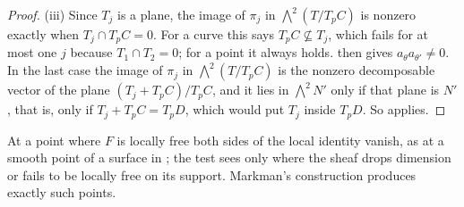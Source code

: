 \documentclass[11pt,reqno]{amsart}
\theoremstyle{plain}
\theoremstyle{definition}
\theoremstyle{remark}
\begin{document}
\begin{proof}
(iii) Since $T_{j}$ is a plane, the image of $\pi_{j}$ in
$\bigwedge^{2}(T/T_{p}C)$ is nonzero exactly when $T_{j}\cap T_{p}C=0$. For a
curve this says $T_{p}C\not\subseteq T_{j}$, which fails for at most one $j$
because $T_{1}\cap T_{2}=0$; for a point it always holds. 
then gives $a_{\theta}a_{\theta'}\ne0$. In the last case the image of
$\pi_{j}$ in $\bigwedge^{2}(T/T_{p}C)$ is the nonzero decomposable vector of
the plane $(T_{j}+T_{p}C)/T_{p}C$, and it lies in $\bigwedge^{2}N'$ only if
that plane is $N'$, that is, only if $T_{j}+T_{p}C=T_{p}D$, which would put
$T_{j}$ inside $T_{p}D$. So  applies.
\end{proof}

At a point where $F$ is locally free both sides of the local identity vanish,
as at a smooth point of a surface in ; the test sees
only where the sheaf drops dimension or fails to be locally free on its
support. Markman's construction produces exactly such points.
\end{document}
